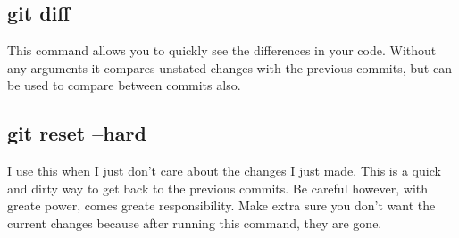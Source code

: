 \documentclass{article}
\begin{document}
\subsection{git diff}
This command allows you to quickly see the differences in your code. Without any arguments it compares unstated changes
with the previous commits, but can be used to compare between commits also.
\subsection{git reset --hard}
I use this when I just don't care about the changes I just made. This is a quick and dirty way to
get back to the previous commits. Be careful however, with greate power, comes greate responsibility.
Make extra sure you don't want the current changes because after running this command, they are gone.
\end{document}
